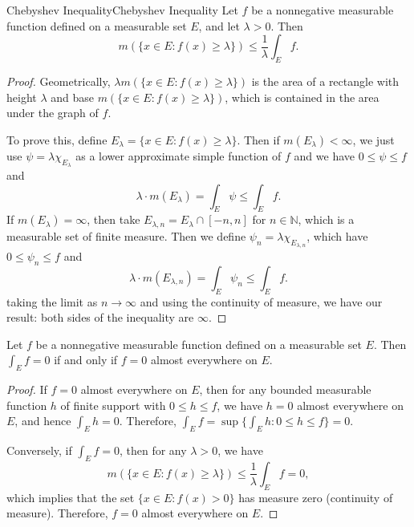 \documentclass[../main.tex]{subfiles}
\begin{document}
\begin{theorem}{Chebyshev Inequality}{Chebyshev Inequality}
	Let $f$ be a nonnegative measurable function defined on a measurable set $E$, and let $\lambda > 0$. Then
	\begin{equation}
		m(\{x \in E : f(x) \geq \lambda\}) \leq \frac{1}{\lambda} \int_E f.
	\end{equation}
\end{theorem}
\begin{proof}
	Geometrically, $ \lambda m(\{x \in E : f(x) \geq \lambda\})$ is the area of a rectangle with height $\lambda$ and base $m(\{x \in E : f(x) \geq \lambda\})$, which is contained in the area under the graph of $f$.

	To prove this, define $E_\lambda = \{x \in E : f(x) \geq \lambda\}$. Then if $m(E_\lambda) < \infty$, we just use $\psi = \lambda \chi_{E_\lambda}$ as a lower approximate simple function of $f$ and we have $0 \leq \psi \leq f$ and
	\begin{equation*}
		\lambda \cdot m(E_\lambda) = \int_E \psi \leq \int_E f.
	\end{equation*}
	If $m(E_\lambda) = \infty$, then take $E_{\lambda, n} = E_\lambda \cap [-n, n]$ for $n \in \mathbb{N}$, which is a measurable set of finite measure. Then we define $\psi_n = \lambda \chi_{E_{\lambda, n}}$, which have $0 \leq \psi_n \leq f$ and
	\begin{equation*}
		\lambda \cdot m(E_{\lambda, n}) = \int_E \psi_n \leq \int_E f.
	\end{equation*}
	taking the limit as $n \to \infty$ and using the continuity of measure, we have our result: both sides of the inequality are $\infty$.
\end{proof}

\begin{proposition}{}{}
	Let $f$ be a nonnegative measurable function defined on a measurable set $E$. Then $\int_E f = 0$ if and only if $f = 0$ almost everywhere on $E$.
\end{proposition}
\begin{proof}
	If $f = 0$ almost everywhere on $E$, then for any bounded measurable function $h$ of finite support with $0 \leq h \leq f$, we have $h = 0$ almost everywhere on $E$, and hence $\int_E h = 0$. Therefore, $\int_E f = \sup \{ \int_E h : 0 \leq h \leq f \} = 0$.

	Conversely, if $\int_E f = 0$, then for any $\lambda > 0$, we have
	\begin{equation*}
		m(\{x \in E : f(x) \geq \lambda\}) \leq \frac{1}{\lambda} \int_E f = 0,
	\end{equation*}
	which implies that the set $\{x \in E : f(x) > 0\}$ has measure zero (continuity of measure). Therefore, $f = 0$ almost everywhere on $E$.
\end{proof}
\end{document}
